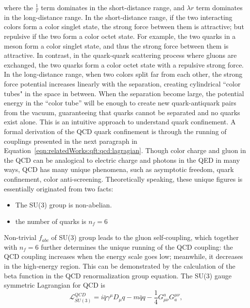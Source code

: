 \noindent where  the $\frac{1}{r}$ term dominates in the short-distance range, and $\lambda r$ term dominates in the long-distance range. In the short-distance range, if the two interacting colors form a color singlet state, the strong force between them is attractive; but repulsive if the two form a color octet state. For example, the two quarks in a meson form a color singlet state, and thus the strong force between them is attractive. In contrast, in the quark-quark scattering process where gluons are exchanged, the two quarks form a color octet state with a repulsive strong force. In the long-distance range, when two colors split far from each other, the strong force potential increases linearly with the separation, creating cylindrical ``color tubes" in the space in between. When the separation become large, the potential energy in the ``color tube'' will be enough to create new quark-antiquark pairs from the vacuum, guaranteeing that quarks cannot be separated and no quarks exist alone. This is an intuitive approach to understand quark confinement. A formal derivation of the QCD quark confinement is through the running of couplings presented in the next paragraph in Equation~\ref{eqn:relatedWorks:qft:qcd:lagragian}. Though color charge and gluon in the QCD can be analogical to electric charge and photons in the QED  in many ways, QCD has many unique phenomena, such as asymptotic freedom, quark confinement, color anti-screening. Theoretically speaking, these unique figures is essentially originated from two facts:
\begin{itemize}
\item The SU(3) group is non-abelian.
\item the number of quarks is $n_f=6$ 
\end{itemize}

\noindent Non-trivial $f_{abc}$ of SU(3) group leads to the gluon self-coupling, which together with $n_f=6$ further determines the unique running of the QCD coupling: the QCD coupling increases when the energy scale goes low; meanwhile, it decreases in the high-energy region.  This can be demonstrated by the calculation of the beta function in the QCD renormalization group equation.  The SU(3) gauge symmetric Lagrangian for QCD is
\begin{equation}
    \mathcal{L}^{QCD}_{SU(3)} = i\bar{q}\gamma^\mu D_\mu q  - m\bar{q} q - \frac{1}{4}G^a_{\mu\nu}G^{\mu\nu}_a, 
    \label{eqn:relatedWorks:qft:qcd:lagragian}
\end{equation}

